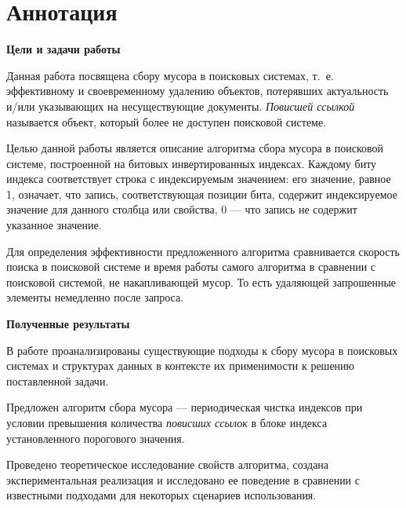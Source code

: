 \newpage
\section*{Аннотация}

\textbf{Цели и задачи работы}

Данная работа посвящена сбору мусора в поисковых системах, т.~е. эффективному и
своевременному удалению объектов, потерявших актуальность и/или указывающих на
несуществующие документы. \textit{Повисшей ссылкой} называется объект, который
более не доступен поисковой системе.

Целью данной работы является описание алгоритма сбора мусора в поисковой системе,
построенной на битовых инвертированных индексах. Каждому биту индекса
соответствует строка с индексируемым значением: его значение, равное 1, означает,
что запись, соответствующая позиции бита, содержит индексируемое значение для
данного столбца или свойства, 0 — что запись не содержит указанное значение.

Для определения эффективности предложенного алгоритма сравнивается скорость
поиска в поисковой системе и время работы самого алгоритма в сравнении с
поисковой системой, не накапливающей мусор. То есть удаляющей запрошенные
элементы немедленно после запроса.

\textbf{Полученные результаты}

В работе проанализированы существующие подходы к сбору мусора в поисковых
системах и структурах данных в контексте их применимости к решению поставленной
задачи.

Предложен алгоритм сбора мусора --- периодическая чистка индексов при условии
превышения количества \textit{повисших ссылок} в блоке индекса установленного
порогового значения.

Проведено теоретическое исследование свойств алгоритма, создана экспериментальная
реализация и исследовано ее поведение в сравнении с известными подходами для
некоторых сценариев использования.
